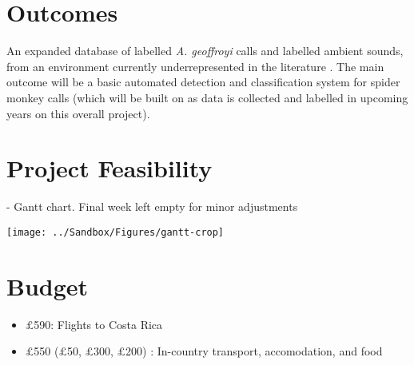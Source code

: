 \documentclass[11pt]{article}
\begin{document}
\section{Outcomes}
An expanded database of labelled \textit{A. geoffroyi} calls and labelled ambient sounds, from an environment currently underrepresented in the literature \citep{browning2017passive}. The main outcome will be a basic automated detection and classification system for spider monkey calls (which will be built on as data is collected and labelled in upcoming years on this overall project).

\section{Project Feasibility}
\begin{table} [hbtp]
	\caption{- Gantt chart. Final week left empty for minor adjustments}
	\label{tab:gantt}
	\texttt{[image: ../Sandbox/Figures/gantt-crop]}
\end{table}

\section{Budget}
\begin{itemize}
	\item $\pounds$590: Flights to Costa Rica
	\item $\pounds$550 ($\pounds$50, $\pounds$300, $\pounds$200) : In-country transport, accomodation, and food
\end{itemize}

\newpage

	
\end{document}
